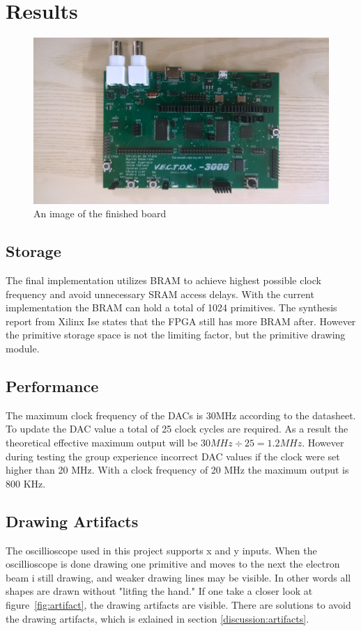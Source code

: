 \chapter{Results}

\begin{figure}[h!]
	    \includegraphics[width=\linewidth, angle=180]{images/board.jpg}
	    \caption{An image of the finished \vthreek board}
	    \label{fig:board}
\end{figure}

\section{Storage}
The final implementation utilizes BRAM to achieve highest possible clock frequency and avoid unnecessary SRAM access delays.
With the current implementation the BRAM can hold a total of 1024 primitives.
The synthesis report from Xilinx Ise states that the FPGA still has more BRAM after.
However the primitive storage space is not the limiting factor, but the primitive drawing module.

\section{Performance}
The maximum clock frequency of the DACs is 30MHz according to the datasheet.
To update the DAC value a total of 25 clock cycles are required.
As a result the theoretical effective maximum output will be \(30 MHz \div 25 = 1.2 MHz \).
However during testing the group experience incorrect DAC values if the clock were set higher than 20 MHz.
With a clock frequency of 20 MHz the maximum output is 800 KHz.

\section{Drawing Artifacts}
The oscillioscope used in this project supports x and y inputs.
When the oscillioscope is done drawing one primitive and moves to the next the electron beam i still drawing,
and weaker drawing lines may be visible.
In other words all shapes are drawn without "litfing the hand."
If one take a closer look at figure~\ref{fig:artifact}, the drawing artifacts are visible.
There are solutions to avoid the drawing artifacts, which is exlained in section \ref{discussion:artifacts}.


